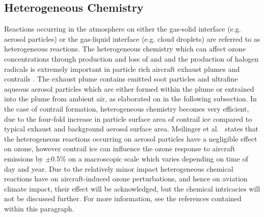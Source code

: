 

\subsection{Heterogeneous Chemistry}
Reactions occurring in the atmosphere on either the gas-solid interface (e.g. aerosol particles) or the gas-liquid interface (e.g. cloud droplets) are referred to as heterogeneous reactions. The heterogeneous chemistry which can affect ozone concentrations through production and loss of  and  and the production of halogen radicals is extremely important in particle rich aircraft exhaust plumes and contrails \cite{Jacob2000}. The exhaust plume contains emitted soot particles and ultrafine aqueous aerosol particles which are either formed within the plume or entrained into the plume from ambient air, as elaborated on in the following subsection. In the case of contrail formation, heterogeneous chemistry becomes very efficient, due to the four-fold increase in particle surface area of contrail ice compared to typical exhaust and background aerosol surface area. Meilinger et al.\ \cite{Meilinger2005} states that the heterogeneous reactions occurring on aerosol particles have a negligible effect on ozone, however contrail ice can influence the ozone response to aircraft emissions by $\pm$0.5\% on a macroscopic scale which varies depending on time of day and year. Due to the relatively minor impact heterogeneous chemical reactions have on aircraft-induced ozone perturbations, and hence on aviation climate impact, their effect will be acknowledged, but the chemical intricacies will not be discussed further. For more information, see the references contained within this paragraph. 

